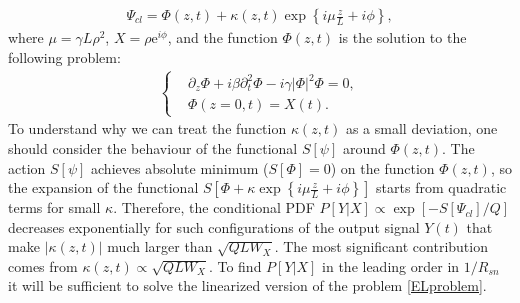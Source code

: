 \documentclass{article}
\begin{document}
\begin{eqnarray}\label{psiclform}
    \Psi_{cl} = \Phi(z,t) + \kappa(z,t)\exp\left\{i\mu\frac{z}{L} + i\phi\right\},
\end{eqnarray}
where $\mu = \gamma L \rho^{2}$, $X = \rho \textrm{e}^{i\phi}$, and the function $\Phi(z,t)$ is the solution to the following problem:
\begin{eqnarray}\label{phiproblem}
    \begin{cases}
        &\partial_{z}\Phi + i\beta\partial^2_{t}\Phi - i\gamma|\Phi|^2\Phi = 0,\\
        &\Phi(z = 0, t) = X(t).
    \end{cases}
\end{eqnarray}
To understand why we can treat the function $\kappa(z,t)$ as a small deviation, one should consider the behaviour of the functional $S[\psi]$ around $\Phi(z,t)$. The action $S[\psi]$ achieves absolute minimum ($S[\Phi]=0$) on the function $\Phi(z,t)$, so the expansion of the functional $S[\Phi + \kappa \exp \left\{i\mu\frac{z}{L} + i\phi\right\} ]$ starts from quadratic terms for small $\kappa$.
Therefore, the conditional PDF $P[Y|X]\propto \exp[-S[\Psi_{cl}]/Q]$ decreases exponentially for such configurations of the output signal $Y(t)$ that make $|\kappa(z,t)|$ much larger than $\sqrt{QLW_{X}}$. The most significant contribution comes from $\kappa(z,t)\propto \sqrt{QLW_{X}}$. To find $P[Y|X]$ in the leading order in $1/R_{sn}$ it will be sufficient to solve the linearized version of the problem \eqref{ELproblem}. 
\end{document}
